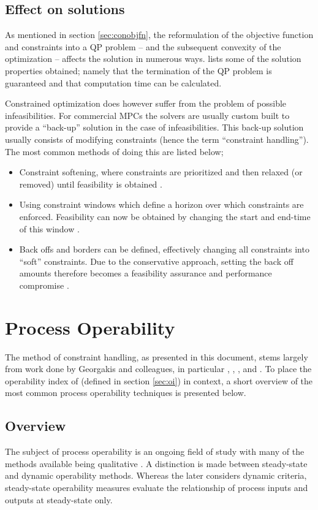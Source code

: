 \subsection{Effect on solutions}\label{sec:coneffsol}
As mentioned in section \ref{sec:conobjfn}, the reformulation of the objective function and constraints into a QP problem -- and the subsequent convexity of the optimization -- affects the solution in numerous ways.
\citet[83]{maciejowskimpc} lists some of the solution properties obtained; namely that the termination of the QP problem is guaranteed and that computation time can be calculated.

Constrained optimization does however suffer from the problem of possible infeasibilities. 
For commercial MPCs the solvers are usually custom built to provide a ``back-up'' solution in the case of infeasibilities.
This back-up solution usually consists of modifying constraints (hence the term ``constraint handling'').
The most common methods of doing this are listed below;
\begin{itemize}
\item Constraint softening, where constraints are prioritized and then relaxed (or removed) until feasibility is obtained \citep[160]{rossiter}.
\item Using constraint windows which define a horizon over which constraints are enforced.
Feasibility can now be obtained by changing the start and end-time of this window \citep[281-282]{maciejowskimpc}.
\item Back offs and borders can be defined, effectively changing all constraints into ``soft'' constraints.
Due to the conservative approach, setting the back off amounts therefore becomes a feasibility assurance and performance compromise .
\end{itemize}

\section{Process Operability}
The method of constraint handling, as presented in this document, stems largely from work done by Georgakis and colleagues, in particular \citet{vinsonphd}, \citet{vinsonartoi}, \citet{limaphd}, \citet{opconproc} and \citet{opidealrx}. 
To place the operability index of \citet{vinsonphd} (defined in section \ref{sec:oi}) in context, a short overview of the most common process operability techniques is presented below.

\subsection{Overview}
The subject of process operability is an ongoing field of study with many of the methods available being qualitative \citep[164]{skogestad}. 
A distinction is made between steady-state and dynamic operability methods. 
Whereas the later considers dynamic criteria, steady-state operability measures evaluate the relationship of process inputs and outputs at steady-state only.

